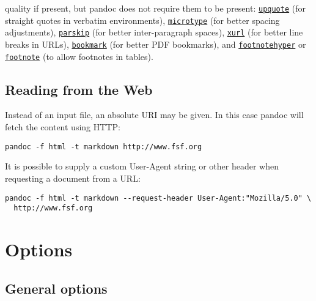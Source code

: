 quality if present, but pandoc does not require them to be present:
\href{https://ctan.org/pkg/upquote}{\texttt{upquote}} (for straight
quotes in verbatim environments),
\href{https://ctan.org/pkg/microtype}{\texttt{microtype}} (for better
spacing adjustments),
\href{https://ctan.org/pkg/parskip}{\texttt{parskip}} (for better
inter-paragraph spaces), \href{https://ctan.org/pkg/xurl}{\texttt{xurl}}
(for better line breaks in URLs),
\href{https://ctan.org/pkg/bookmark}{\texttt{bookmark}} (for better PDF
bookmarks), and
\href{https://ctan.org/pkg/footnotehyper}{\texttt{footnotehyper}} or
\href{https://ctan.org/pkg/footnote}{\texttt{footnote}} (to allow
footnotes in tables).

\hypertarget{reading-from-the-web}{%
\subsection{Reading from the Web}\label{reading-from-the-web}}

Instead of an input file, an absolute URI may be given. In this case
pandoc will fetch the content using HTTP:

\begin{verbatim}
pandoc -f html -t markdown http://www.fsf.org
\end{verbatim}

It is possible to supply a custom User-Agent string or other header when
requesting a document from a URL:

\begin{verbatim}
pandoc -f html -t markdown --request-header User-Agent:"Mozilla/5.0" \
  http://www.fsf.org
\end{verbatim}

\hypertarget{options}{%
\section{Options}\label{options}}

\hypertarget{general-options}{%
\subsection{General options}\label{general-options}}

